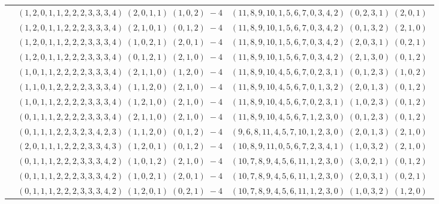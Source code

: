 \documentclass[11pt]{article}
\begin{document}
\begin{longtable}[l]{|c|c|c|}
 \cline{2-3} 
 & $(1 ,2 ,0 ,1 ,1 ,2 ,2 ,2 ,3 ,3 ,3 ,4) \;(2 ,0 ,1 ,1) \;(1 ,0 ,2) \;-4$ & $(11 ,8 ,9 ,10 ,1 ,5 ,6 ,7 ,0 ,3 ,4 ,2) \;(0 ,2 ,3 ,1) \;(2 ,0 ,1) \;$\\ 
 \cline{2-3} 
 & $(1 ,2 ,0 ,1 ,1 ,2 ,2 ,2 ,3 ,3 ,3 ,4) \;(2 ,1 ,0 ,1) \;(0 ,1 ,2) \;-4$ & $(11 ,8 ,9 ,10 ,1 ,5 ,6 ,7 ,0 ,3 ,4 ,2) \;(0 ,1 ,3 ,2) \;(2 ,1 ,0) \;$\\ 
 \cline{2-3} 
 & $(1 ,2 ,0 ,1 ,1 ,2 ,2 ,2 ,3 ,3 ,3 ,4) \;(1 ,0 ,2 ,1) \;(2 ,0 ,1) \;-4$ & $(11 ,8 ,9 ,10 ,1 ,5 ,6 ,7 ,0 ,3 ,4 ,2) \;(2 ,0 ,3 ,1) \;(0 ,2 ,1) \;$\\ 
 \cline{2-3} 
 & $(1 ,2 ,0 ,1 ,1 ,2 ,2 ,2 ,3 ,3 ,3 ,4) \;(0 ,1 ,2 ,1) \;(2 ,1 ,0) \;-4$ & $(11 ,8 ,9 ,10 ,1 ,5 ,6 ,7 ,0 ,3 ,4 ,2) \;(2 ,1 ,3 ,0) \;(0 ,1 ,2) \;$\\ 
 \cline{2-3} 
 & $(1 ,0 ,1 ,1 ,2 ,2 ,2 ,2 ,3 ,3 ,3 ,4) \;(2 ,1 ,1 ,0) \;(1 ,2 ,0) \;-4$ & $(11 ,8 ,9 ,10 ,4 ,5 ,6 ,7 ,0 ,2 ,3 ,1) \;(0 ,1 ,2 ,3) \;(1 ,0 ,2) \;$\\ 
 \cline{2-3} 
 & $(1 ,1 ,0 ,1 ,2 ,2 ,2 ,2 ,3 ,3 ,3 ,4) \;(1 ,1 ,2 ,0) \;(2 ,1 ,0) \;-4$ & $(11 ,8 ,9 ,10 ,4 ,5 ,6 ,7 ,0 ,1 ,3 ,2) \;(2 ,0 ,1 ,3) \;(0 ,1 ,2) \;$\\ 
 \cline{2-3} 
 & $(1 ,0 ,1 ,1 ,2 ,2 ,2 ,2 ,3 ,3 ,3 ,4) \;(1 ,2 ,1 ,0) \;(2 ,1 ,0) \;-4$ & $(11 ,8 ,9 ,10 ,4 ,5 ,6 ,7 ,0 ,2 ,3 ,1) \;(1 ,0 ,2 ,3) \;(0 ,1 ,2) \;$\\ 
 \cline{2-3} 
 & $(0 ,1 ,1 ,1 ,2 ,2 ,2 ,2 ,3 ,3 ,3 ,4) \;(2 ,1 ,1 ,0) \;(2 ,1 ,0) \;-4$ & $(11 ,8 ,9 ,10 ,4 ,5 ,6 ,7 ,1 ,2 ,3 ,0) \;(0 ,1 ,2 ,3) \;(0 ,1 ,2) \;$\\ 
 \cline{2-3} 
 & $(0 ,1 ,1 ,1 ,2 ,2 ,3 ,2 ,3 ,4 ,2 ,3) \;(1 ,1 ,2 ,0) \;(0 ,1 ,2) \;-4$ & $(9 ,6 ,8 ,11 ,4 ,5 ,7 ,10 ,1 ,2 ,3 ,0) \;(2 ,0 ,1 ,3) \;(2 ,1 ,0) \;$\\ 
 \cline{2-3} 
 & $(2 ,0 ,1 ,1 ,1 ,2 ,2 ,2 ,3 ,3 ,4 ,3) \;(1 ,2 ,0 ,1) \;(0 ,1 ,2) \;-4$ & $(10 ,8 ,9 ,11 ,0 ,5 ,6 ,7 ,2 ,3 ,4 ,1) \;(1 ,0 ,3 ,2) \;(2 ,1 ,0) \;$\\ 
 \cline{2-3} 
 & $(0 ,1 ,1 ,1 ,2 ,2 ,2 ,3 ,3 ,3 ,4 ,2) \;(1 ,0 ,1 ,2) \;(2 ,1 ,0) \;-4$ & $(10 ,7 ,8 ,9 ,4 ,5 ,6 ,11 ,1 ,2 ,3 ,0) \;(3 ,0 ,2 ,1) \;(0 ,1 ,2) \;$\\ 
 \cline{2-3} 
 & $(0 ,1 ,1 ,1 ,2 ,2 ,2 ,3 ,3 ,3 ,4 ,2) \;(1 ,0 ,2 ,1) \;(2 ,0 ,1) \;-4$ & $(10 ,7 ,8 ,9 ,4 ,5 ,6 ,11 ,1 ,2 ,3 ,0) \;(2 ,0 ,3 ,1) \;(0 ,2 ,1) \;$\\ 
 \cline{2-3} 
 & $(0 ,1 ,1 ,1 ,2 ,2 ,2 ,3 ,3 ,3 ,4 ,2) \;(1 ,2 ,0 ,1) \;(0 ,2 ,1) \;-4$ & $(10 ,7 ,8 ,9 ,4 ,5 ,6 ,11 ,1 ,2 ,3 ,0) \;(1 ,0 ,3 ,2) \;(1 ,2 ,0) \;$\\ 

\end{longtable}
\end{document}

